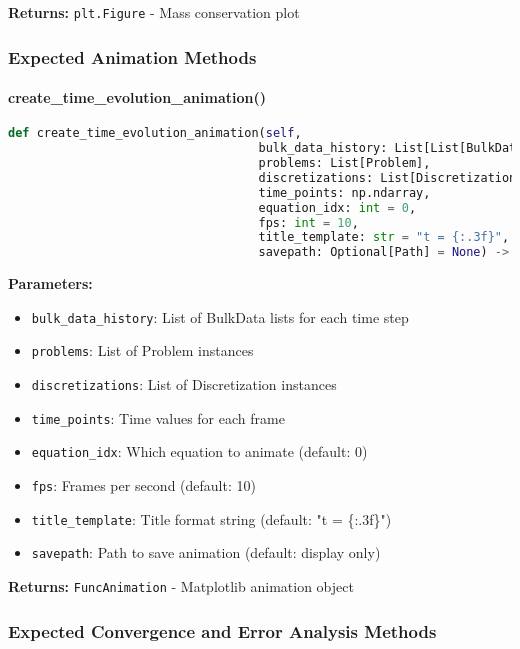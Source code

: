 \textbf{Returns:} \texttt{plt.Figure} - Mass conservation plot

\subsubsection{Expected Animation Methods}

\paragraph{create\_time\_evolution\_animation()}\leavevmode
\begin{lstlisting}[language=Python, caption=Expected Animation Creation Method]
def create_time_evolution_animation(self,
                                   bulk_data_history: List[List[BulkData]],
                                   problems: List[Problem],
                                   discretizations: List[Discretization],
                                   time_points: np.ndarray,
                                   equation_idx: int = 0,
                                   fps: int = 10,
                                   title_template: str = "t = {:.3f}",
                                   savepath: Optional[Path] = None) -> FuncAnimation
\end{lstlisting}

\textbf{Parameters:}
\begin{itemize}
    \item \texttt{bulk\_data\_history}: List of BulkData lists for each time step
    \item \texttt{problems}: List of Problem instances
    \item \texttt{discretizations}: List of Discretization instances
    \item \texttt{time\_points}: Time values for each frame
    \item \texttt{equation\_idx}: Which equation to animate (default: 0)
    \item \texttt{fps}: Frames per second (default: 10)
    \item \texttt{title\_template}: Title format string (default: "t = \{:.3f\}")
    \item \texttt{savepath}: Path to save animation (default: display only)
\end{itemize}

\textbf{Returns:} \texttt{FuncAnimation} - Matplotlib animation object

\subsubsection{Expected Convergence and Error Analysis Methods}

